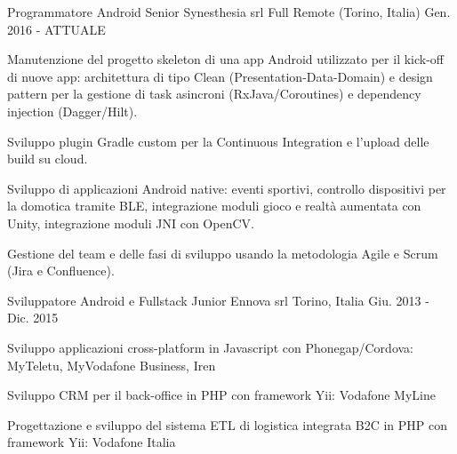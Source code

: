 


\begin{cventries}


\cventry
{Programmatore Android Senior} %
{Synesthesia srl} %
{Full Remote (Torino, Italia)} %
{Gen. 2016 - ATTUALE} %
{ %
	\begin{cvitems}
		\item {Manutenzione del progetto skeleton di una app Android utilizzato per il kick-off di nuove app: architettura di tipo Clean (Presentation-Data-Domain) e design pattern per la gestione di task asincroni (RxJava/Coroutines) e dependency injection (Dagger/Hilt).}
		\item {Sviluppo plugin Gradle custom per la Continuous Integration e l'upload delle build su cloud.}
		\item {Sviluppo di applicazioni Android native: eventi sportivi, controllo dispositivi per la domotica tramite BLE, integrazione moduli gioco e realtà aumentata con Unity, integrazione moduli JNI con OpenCV.}
		\item {Gestione del team e delle fasi di sviluppo usando la metodologia Agile e Scrum (Jira e Confluence). }
	\end{cvitems}
}


\cventry
{Sviluppatore Android e Fullstack Junior} %
{Ennova srl} %
{Torino, Italia} %
{Giu. 2013 - Dic. 2015} %
{ %
	\begin{cvitems}
		\item {Sviluppo applicazioni cross-platform in Javascript con Phonegap/Cordova: MyTeletu, MyVodafone Business, Iren}
		\item {Sviluppo CRM per il back-office in PHP con framework Yii: Vodafone MyLine}
		\item {Progettazione e sviluppo del sistema ETL di logistica integrata B2C in PHP con framework Yii: Vodafone Italia}
	\end{cvitems}
}


\end{cventries}